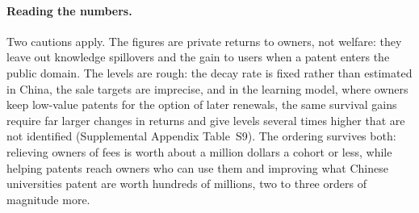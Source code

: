 

\paragraph{Reading the numbers.} Two cautions apply. The figures are private returns to owners, not welfare: they
leave out knowledge spillovers and the gain to users when a patent enters the public domain. The levels are rough: the
decay rate is fixed rather than estimated in China, the sale targets are imprecise, and in the learning model, where
owners keep low-value patents for the option of later renewals, the same survival gains require far larger changes in
returns and give levels several times higher that are not identified (Supplemental Appendix Table~S9). The ordering survives both: relieving owners of fees is worth
about a million dollars a cohort or less, while helping patents reach owners who can use them and improving what Chinese
universities patent are worth hundreds of millions, two to three orders of magnitude more.
